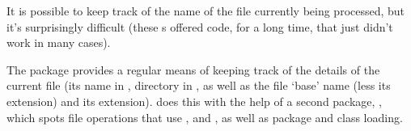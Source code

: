 
It is possible to keep track of the name of the file currently being
processed, but it's surprisingly difficult (these s offered
code, for a long time, that just didn't work in many cases).

The  package provides a regular means of keeping
track of the details of the current file (its name in
, directory in , as well as the
file `base' name (less its extension) and its extension).
 does this with the help of a second package,
, which spots file operations that use ,
 and , as well as package and
class loading.

